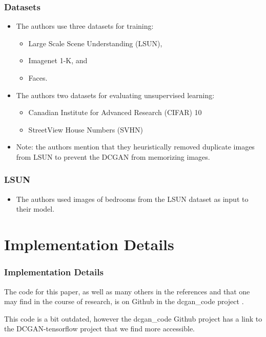 \documentclass{beamer}
\begin{document}
\begin{frame}
\frametitle{Datasets}
\begin{itemize}
  \item The authors use three datasets for training:
  \begin{itemize}
    \item Large Scale Scene Understanding (LSUN),
    \item Imagenet 1-K, and
    \item Faces.
  \end{itemize}  
  \item The authors two datasets for evaluating unsupervised learning:
  \begin{itemize}
    \item Canadian Institute for Advanced Research (CIFAR) 10
    \item StreetView House Numbers (SVHN)
  \end{itemize}
  \item Note: the authors mention that they heuristically removed duplicate
    images from LSUN to prevent the DCGAN from memorizing images.
\end{itemize}
\end{frame}


\begin{frame}
\frametitle{LSUN}
\begin{itemize}
 \item The authors used images of bedrooms from the LSUN dataset \cite{lsunDataset} as input to their model.
\end{itemize}
\end{frame}


\section{Implementation Details}
\begin{frame}
\frametitle{Implementation Details}
The code for this paper, as well as many others in the references and
that one may find in the course of research, is on Github in the dcgan\_code
project \cite{dcganCode}.

This code is a bit outdated, however the dcgan\_code Github project has a link
to the DCGAN-tensorflow \cite{dcganTf} project that we find more accessible.
\end{frame}
\end{document}
